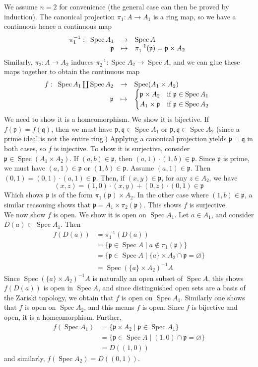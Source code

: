 \documentclass{article}
\DeclareMathOperator{\Spec}{Spec}
\newcommand{\applic}[4]{\begin{array}[t]{rcl}
#1 & \to & #2 \\
#3 & \mapsto & #4
\end{array}}
\newcommand{\p}{\mathfrak{p}}
\newcommand{\q}{\mathfrak{q}}
\newcommand{\exercise}{\subsubsection} %
\begin{document}
\exercise{} We assume $n=2$ for convenience (the general case can then be proved by induction). The canonical projection $\pi_1 : A \to A_1$ is a ring map, so we have a continuous hence a continuous map
\[\pi_1^{-1} : \applic{\Spec A_1}{\Spec A}{\p}{\pi_1^{-1}(\p) = \p \times A_2}\]
Similarly, $\pi_2 : A \to A_2$ induces $\pi_2^{-1} : \Spec A_2 \to \Spec A$, and we can glue these maps together to obtain the continuous map
\[f : \applic{\Spec A_1 \coprod \Spec A_2}{\Spec (A_1 \times A_2)}{\p}{
    \begin{cases}
        \p \times A_2 & \text{if $\p \in \Spec A_1$} \\
        A_1 \times \p & \text{if $\p \in \Spec A_2$}
    \end{cases}
}\]
We need to show it is a homeomorphism. We show it is bijective. If $f(\p) = f(\q)$, then we must have $\p, \q \in \Spec A_1$ or $\p, \q \in \Spec A_2$ (since a prime ideal is not the entire ring.) Applying a canonical projection yields $\p = \q$ in both cases, so $f$ is injective. To show it is surjective, consider $\p \in \Spec (A_1 \times A_2)$. If $(a,b) \in \p$, then $(a,1)\cdot(1,b) \in \p$. Since $\p$ is prime, we must have $(a,1) \in \p$ or $(1,b) \in \p$. Assume $(a,1) \in \p$. Then $(0,1) = (0,1)\cdot (a,1) \in \p$. Then, if $(x,y) \in \p$, for any $z \in A_2$, we have
\[(x,z) = (1,0)\cdot (x,y) + (0,z)\cdot (0,1) \in \p\]
Which shows $\p$ is of the form $\pi_1(\p) \times A_2$. In the other case where $(1,b) \in \p$, a similar reasoning shows that $\p = A_1 \times \pi_2(\p)$. This shows $f$ is surjective. \\
We now show $f$ is open. We show it is open on $\Spec A_1$. Let $a \in A_1$, and consider $D(a) \subset \Spec A_1$. Then
\begin{align*}
    f(D(a)) & = \pi_1^{-1}(D(a)) \\
    & = \{\p \in \Spec A \mid a \notin \pi_1 (\p)\} \\
    & = \{\p \in \Spec A \mid \{a\} \times A_2 \cap \p = \varnothing\} \\
    & = \Spec (\{a\}\times A_2)^{-1}A
\end{align*}
Since $\Spec (\{a\}\times A_2)^{-1}A$ is naturally an open subset of $\Spec A$, this shows $f(D(a))$ is open in $\Spec A$, and since distinguished open sets are a basis of the Zariski topology, we obtain that $f$ is open on $\Spec A_1$. Similarly one shows that $f$ is open on $\Spec A_2$, and this means $f$ is open. Since $f$ is bijective and open, it is a homeomorphism. Further,
\begin{align*}
    f(\Spec A_1) & = \{\p \times A_2 \mid \p \in \Spec A_1\} \\
    & = \{\p \in \Spec A \mid (1,0) \cap \p = \varnothing\} \\
    & = D((1,0))
\end{align*}
and similarly, $f(\Spec A_2) = D((0,1))$.
\end{document}
